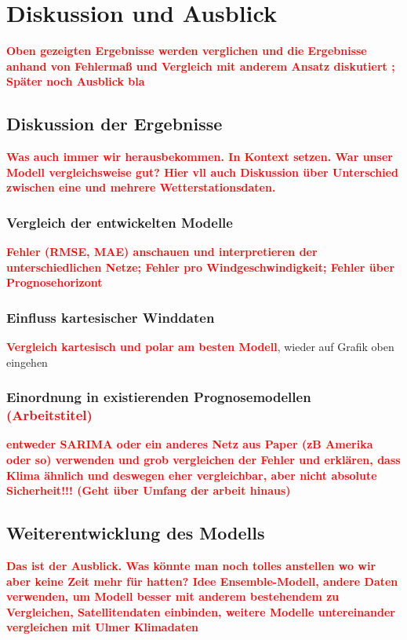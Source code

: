 \documentclass[
12pt, %
toc=listofnumbered, %
toc=chapterentrydotfill, %
numbers=noenddot, %
captions=tableheading, %
bibliography=numbered
]{scrreprt}
\let\Oldsection\section
\renewcommand{\section}{\FloatBarrier\Oldsection}
\let\Oldsubsection\subsection
\renewcommand{\subsection}{\FloatBarrier\Oldsubsection}
\newcommand{\highlight}[1]{\textbf{\textcolor{red}{#1}}}
\begin{document}
\chapter{Diskussion und Ausblick}
\highlight{Oben gezeigten Ergebnisse werden verglichen und die Ergebnisse anhand von Fehlermaß und Vergleich mit anderem Ansatz diskutiert ;
Später noch Ausblick bla}

\section{Diskussion der Ergebnisse}
\highlight{Was auch immer wir herausbekommen. In Kontext setzen. War unser Modell vergleichsweise gut? Hier vll auch 
Diskussion über Unterschied zwischen eine und mehrere Wetterstationsdaten.}

\subsection{Vergleich der entwickelten Modelle}
\highlight{Fehler (RMSE, MAE) anschauen und interpretieren der unterschiedlichen Netze; 
Fehler pro Windgeschwindigkeit; Fehler über Prognosehorizont}

\subsection{Einfluss kartesischer Winddaten}
\highlight{Vergleich kartesisch und polar am besten Modell}, wieder auf Grafik oben eingehen

\subsection{Einordnung in existierenden Prognosemodellen \highlight{(Arbeitstitel)}}
\highlight{entweder SARIMA oder ein anderes Netz aus Paper (zB Amerika oder so) verwenden und grob vergleichen der Fehler und erklären, dass
 Klima ähnlich und deswegen eher vergleichbar, aber nicht absolute Sicherheit!!! (Geht über Umfang der arbeit hinaus)}

\section{Weiterentwicklung des Modells}
\highlight{Das ist der Ausblick. Was könnte man noch tolles anstellen wo wir aber keine Zeit mehr für hatten? Idee Ensemble-Modell, andere Daten 
verwenden, um Modell besser mit anderem bestehendem zu Vergleichen, Satellitendaten einbinden, weitere Modelle untereinander vergleichen mit Ulmer Klimadaten}
\end{document}

